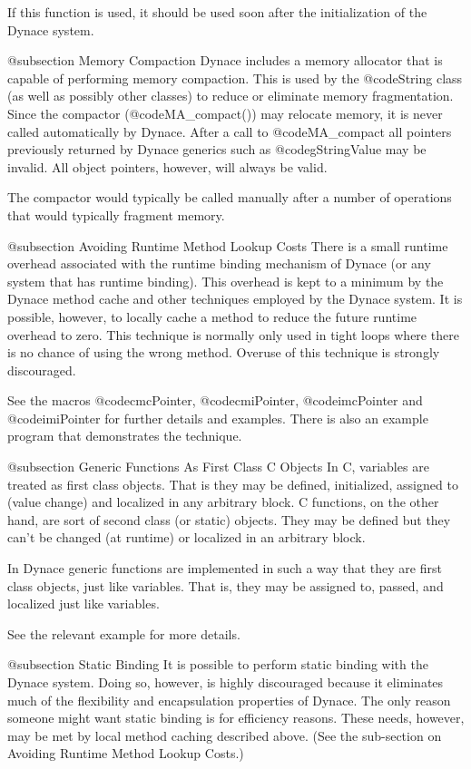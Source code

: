 If this function is used, it should be used soon after the initialization
of the Dynace system.


@subsection Memory Compaction
Dynace includes a memory allocator that is capable of performing memory
compaction.  This is used by the @code{String} class (as well as
possibly other classes) to reduce or eliminate memory fragmentation.
Since the compactor (@code{MA_compact()}) may relocate memory, it is
never called automatically by Dynace.  After a call to @code{MA_compact}
all pointers previously returned by Dynace generics such as
@code{gStringValue} may be invalid.  All object pointers, however, will
always be valid.

The compactor would typically be called manually after a number of
operations that would typically fragment memory.


@subsection Avoiding Runtime Method Lookup Costs
There is a small runtime overhead associated with the runtime binding
mechanism of Dynace (or any system that has runtime binding).  This
overhead is kept to a minimum by the Dynace method cache and other techniques
employed by the Dynace system.  It is possible, however, to locally cache
a method to reduce the future runtime overhead to zero.  This
technique is normally only used in tight loops where there is no chance
of using the wrong method.  Overuse of this technique is strongly
discouraged.

See the macros @code{cmcPointer}, @code{cmiPointer}, @code{imcPointer} and
@code{imiPointer} for further details and examples.  There is also an
example program that demonstrates the technique.



@subsection Generic Functions As First Class C Objects
In C, variables are treated as first class objects.  That is they may
be defined, initialized, assigned to (value change) and localized in
any arbitrary block.  C functions, on the other hand, are sort of
second class (or static) objects.  They may be defined but they
can't be changed (at runtime) or localized in an arbitrary block.

In Dynace generic functions are implemented in such a way that they
are first class objects, just like variables.  That is, they may
be assigned to, passed, and localized just like variables.

See the relevant example for more details.


@subsection Static Binding
It is possible to perform static binding with the Dynace system.  Doing so,
however, is highly discouraged because it eliminates much of the
flexibility and encapsulation properties of Dynace.  The only reason
someone might want static binding is for efficiency reasons.  These
needs, however, may be met by local method caching described above.
(See the sub-section on Avoiding Runtime Method Lookup Costs.)

